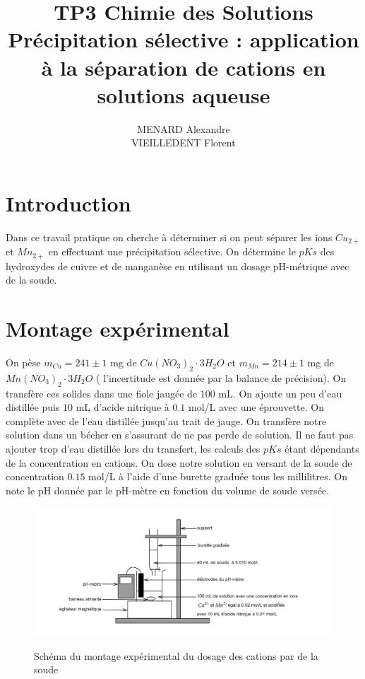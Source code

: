 \documentclass[12pt]{article}
\title{\textbf{TP3 Chimie des Solutions} \\ Précipitation sélective : application à la séparation de cations en solutions aqueuse}
\author{MENARD Alexandre \\ VIEILLEDENT Florent}
\begin{document}
\maketitle

\section*{Introduction}
Dans ce travail pratique on cherche à déterminer si on peut séparer les ions $Cu_{2+}$ et $Mn_{2+}$ en effectuant une précipitation sélective. On détermine le $pKs$ des hydroxydes de cuivre et de manganèse en utilisant un dosage pH-métrique avec de la soude.
\newpage

\section{Montage expérimental}

On pèse $m_{Cu} = 241 \pm 1$ mg de $Cu(NO_3)_2 \cdot 3 H_2O$ et $m_{Mn}= 214 \pm 1$ mg de $Mn(NO_3)_2\cdot 3 H_2O$ ( l'incertitude est donnée par la balance de précision). On transfère ces solides dans une fiole jaugée de $100 $ mL. On ajoute un peu d'eau distillée puis $10$ mL d'acide nitrique à $0.1 $ mol/L avec une éprouvette. On complète avec de l'eau distillée jusqu'au trait de jauge. On transfère notre solution dans un bécher en s'assurant de ne pas perde de solution. Il ne faut pas ajouter trop d'eau distillée lors du transfert, les calculs des $pKs$ étant dépendants de la concentration en cations. On dose notre solution en versant de la soude de concentration $0.15$ mol/L à l'aide d'une burette graduée tous les millilitres. On note le pH donnée par le pH-mètre en fonction du volume de soude versée.

\begin{figure}[h!]
	\begin{center}
		\includegraphics[scale=0.2]{Schema_dosage.png}
		\label{img:Schema_dosage}
		\caption{Schéma du montage expérimental du dosage des cations par de la soude}
	\end{center}
\end{figure}
\end{document}
